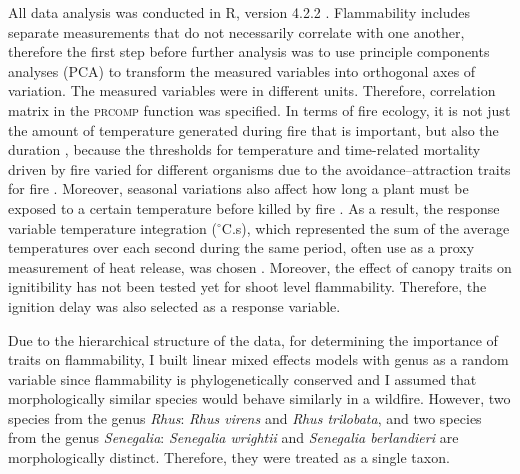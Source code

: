 \documentclass{ttuthes2007}
\newcommand{\pkg}[1]{\textsc{#1}}
\begin{document}
All data analysis was conducted in R, version 4.2.2 \citep{R}. 
Flammability includes separate measurements that do not necessarily correlate with one another, therefore the first step before further analysis was to use principle components analyses (PCA) to transform the measured variables into orthogonal axes of variation. The measured variables were in different units. Therefore, correlation matrix in the \pkg{prcomp} function was specified. In terms of fire ecology, it is not just the amount of temperature generated during fire that is important, but also the duration \citep{mcgranahan2020inconvenient}, because the thresholds for temperature and time-related mortality driven by fire varied for different organisms \citep{nelson1952observations,vines1968heat, bond1983dead, hengst1994bark,pinard1997fire,lawes2011bark, pingree2019myth} due to the avoidance–attraction traits for fire \citep{schwilk2001flammability, archibald2019unified}. Moreover, seasonal variations also affect how long a plant must be exposed to a certain temperature before killed by fire \citep{wright1970method}. As a result, the response variable temperature integration ($^{\circ}$C.s), which represented the sum of the average temperatures over each second during the same period, often use as a proxy measurement of heat release, was chosen \citep{gao2018grass, mcgranahan2020inconvenient}. Moreover, the effect of canopy traits on ignitibility has not been tested yet for shoot level flammability. Therefore, the ignition delay was also selected as a response variable.

Due to the hierarchical structure of the data, for determining the importance of traits on flammability, I built linear mixed effects models with genus as a random variable since flammability is phylogenetically conserved \citep{cui2020shoot} and I assumed that morphologically similar species would behave similarly in a wildfire. However, two species from the genus \emph{Rhus}: \emph{Rhus virens} and \emph{Rhus trilobata}, and two species from the genus \emph{Senegalia}: \emph{Senegalia wrightii} and \emph{Senegalia berlandieri} are morphologically distinct. Therefore, they were treated as a single taxon. 



\end{document}
